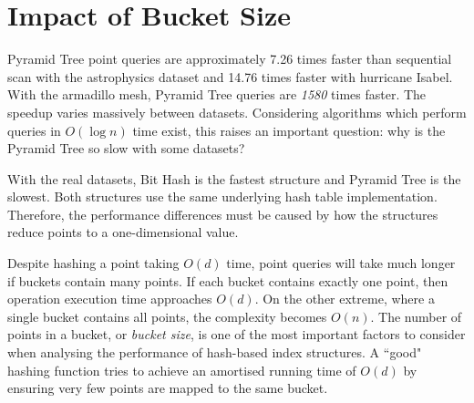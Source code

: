 \section{Impact of Bucket Size}

Pyramid Tree point queries are approximately 7.26 times faster than sequential scan with the astrophysics dataset and 14.76 times faster with hurricane Isabel. With the armadillo mesh, Pyramid Tree queries are \textit{1580} times faster. The speedup varies massively between datasets. Considering algorithms which perform queries in $O(\log n)$ time exist, this raises an important question: why is the Pyramid Tree so slow with some datasets?

With the real datasets, Bit Hash is the fastest structure and Pyramid Tree is the slowest. Both structures use the same underlying hash table implementation. Therefore, the performance differences must be caused by how the structures reduce points to a one-dimensional value. 

Despite hashing a point taking $O(d)$ time, point queries will take much longer if buckets contain many points. If each bucket contains exactly one point, then operation execution time approaches $O(d)$. On the other extreme, where a single bucket contains all points, the complexity becomes $O(n)$. The number of points in a bucket, or \textit{bucket size}, is one of the most important factors to consider when analysing the performance of hash-based index structures. A ``good" hashing function tries to achieve an amortised running time of $O(d)$ by ensuring very few points are mapped to the same bucket.

